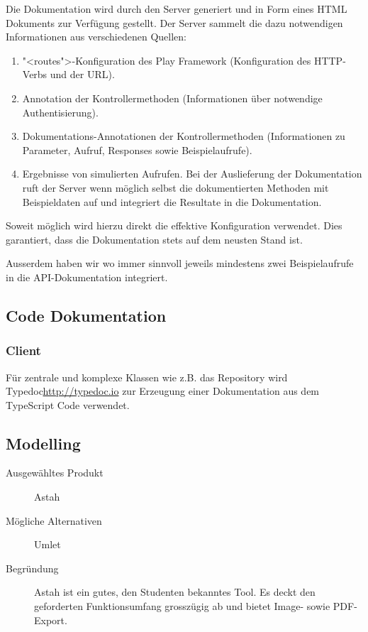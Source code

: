 				Die Dokumentation wird durch den Server generiert und in Form eines HTML Dokuments zur Verfügung gestellt. %
				Der Server sammelt die dazu notwendigen Informationen aus verschiedenen Quellen:
				\begin{enumerate}
					\item "<routes">-Konfiguration des Play Framework (Konfiguration des HTTP-Verbs und der URL).
					\item Annotation der Kontrollermethoden (Informationen über notwendige Authentisierung).
					\item Dokumentations-Annotationen der Kontrollermethoden (Informationen zu Parameter, Aufruf, Responses sowie Beispielaufrufe).
					\item Ergebnisse von simulierten Aufrufen.
						Bei der Auslieferung der Dokumentation ruft der Server wenn möglich selbst die dokumentierten Methoden mit Beispieldaten auf und integriert die Resultate in die Dokumentation.
				\end{enumerate}
				
				Soweit möglich wird hierzu direkt die effektive Konfiguration verwendet. Dies garantiert, dass die Dokumentation stets auf dem neusten Stand ist.
				
				Ausserdem haben wir wo immer sinnvoll jeweils mindestens zwei Beispielaufrufe in die API-Dokumentation integriert.
				
				\subsection{Code Dokumentation}
					\subsubsection{Client}
						Für zentrale und komplexe Klassen wie z.B. das Repository wird Typedoc\url{http://typedoc.io}
						zur Erzeugung einer Dokumentation aus dem TypeScript Code verwendet.


		\subsection{Modelling}
			\begin{description}
				\item[Ausgewähltes Produkt] Astah
				\item[Mögliche Alternativen] Umlet
				\item[Begründung] Astah ist ein gutes, den Studenten bekanntes Tool.
					Es deckt den geforderten Funktionsumfang grosszügig ab und bietet Image- sowie PDF-Export.
			\end{description}
			
